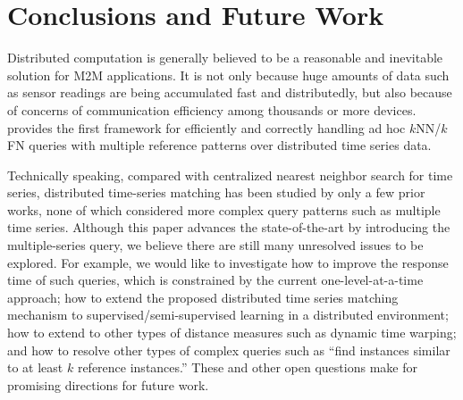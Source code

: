 \section{Conclusions and Future Work}
\label{sec:conclusion}
\balance



Distributed computation is generally believed to be a reasonable and
inevitable solution for M2M applications. It is not only because
huge amounts of data such as sensor readings are being accumulated fast and
distributedly, but also because of concerns of communication efficiency among
thousands or more devices. \MSWave{} provides the first framework for
efficiently and correctly handling ad hoc $k$NN/$k$FN queries with multiple
reference patterns over distributed time series data.


Technically speaking, compared with centralized nearest neighbor
search for time series, distributed time-series matching has been
studied by only a few prior works, none of which considered more
complex query patterns such as multiple time series. Although this
paper advances the state-of-the-art by introducing the multiple-series
query, we believe there are still many unresolved issues to be explored.
For example, we would like to investigate
how to improve the response time of such queries, which is constrained by
the current one-level-at-a-time approach; 
how to extend the proposed distributed time series matching
mechanism to supervised/semi-supervised learning in a distributed environment; 
how to extend \MSWave{} to other types of distance measures such as dynamic time warping; 
and how to resolve other types of complex queries such as ``find instances similar to at 
least $k$ reference instances.''  These and other open questions make for promising
directions for future work.

